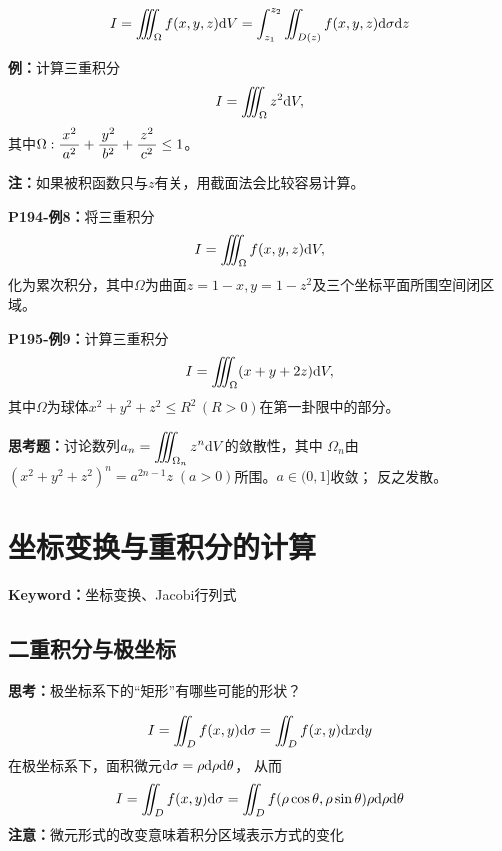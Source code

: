 $${I=\iiint_{\Omega}f(x,y,z)\mathrm{d}
V=\int_{z_1}^{z_2}\iint_{D(z)}f(x,y,z)\mathrm{d}\sigma \mathrm{d} z}$$

{\bf 例：}计算三重积分
$$I=\iiint_{\Omega}z^2\mathrm{d} V,$$
其中$\Omega:\displaystyle\frac{\,{x^2}\,}{\,{a^2}\,}+\displaystyle\frac{\,{y^2}\,}{\,{b^2}\,}+\displaystyle\frac{\,{z^2}\,}{\,{c^2}\,}\leq 1$。

{\bf 注：}如果被积函数只与$z$有关，用截面法会比较容易计算。

{\bf P194-例8：}将三重积分
$$I=\iiint_{\Omega}f(x,y,z)\mathrm{d} V,$$
化为累次积分，其中$\Omega$为曲面$z=1-x,y=1-z^2$及三个坐标平面所围空间闭区域。

{\bf P195-例9：}计算三重积分
$$I=\iiint_{\Omega}(x+y+2z)\mathrm{d} V,$$
其中$\Omega$为球体$x^2+y^2+z^2\leq R^2\,(R>0)$在第一卦限中的部分。

{\bf 思考题：}讨论数列$a_n=\displaystyle\iiint_{\Omega_n}z^n\mathrm{d} V$的敛散性，其中
$\Omega_n$由$(x^2+y^2+z^2)^n=a^{2n-1}z\;(a>0)$所围。\hfill $a\in(0,1]$收敛；
反之发散。

\section{坐标变换与重积分的计算}

{\bf Keyword：}坐标变换、Jacobi行列式

\subsection{二重积分与极坐标}

{\bf 思考：}极坐标系下的“矩形”有哪些可能的形状？

$$I=\iint_Df(x,y)\mathrm{d}\sigma=\iint_Df(x,y)\mathrm{d} x\mathrm{d} y$$
在极坐标系下，面积微元${\mathrm{d}\sigma=\rho \mathrm{d}\rho \mathrm{d}\theta}$， 
从而
$${I=\iint_Df(x,y)\mathrm{d}\sigma=\iint_Df(\rho\cos\theta,\rho\sin\theta)
\rho \mathrm{d}\rho \mathrm{d}\theta}$$
{\bf 注意：}微元形式的改变意味着积分区域表示方式的变化

